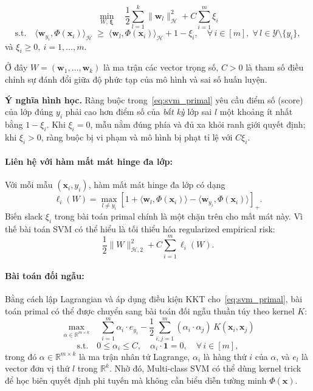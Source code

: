 \begin{equation}
    \min_{W,\,\bm{\xi}}\quad
    \frac{1}{2}\sum_{l=1}^{k}\|\bm{w}_l\|_{\mathcal{H}}^2 + C\sum_{i=1}^{m}\xi_i
    \label{eq:svm_primal}
\end{equation}
\[
    \text{s.t.}\quad
    \langle \bm{w}_{y_i},\Phi(\bm{x}_i)\rangle_{\mathcal{H}} \;\geq\;
    \langle \bm{w}_l,\Phi(\bm{x}_i)\rangle_{\mathcal{H}} + 1 - \xi_i,
    \quad \forall\, i\in[m],\; \forall\, l \in \mathcal{Y}\setminus\{y_i\},
\]
và $\xi_i\geq 0,\ i=1,\ldots,m$.

Ở đây $W = (\bm{w}_1,\ldots,\bm{w}_k)$ là ma trận các vector trọng số, $C > 0$ là tham số điều chỉnh sự đánh đổi giữa độ phức tạp của mô hình và sai số huấn luyện.

\textbf{Ý nghĩa hình học.} Ràng buộc trong~\eqref{eq:svm_primal} yêu cầu điểm số (score) của lớp đúng $y_i$ phải cao hơn điểm số của \emph{bất kỳ} lớp sai $l$ một khoảng ít nhất bằng $1 - \xi_i$. Khi $\xi_i = 0$, mẫu nằm đúng phía và đủ xa khỏi ranh giới quyết định; khi $\xi_i > 0$, ràng buộc bị vi phạm và mô hình bị phạt tỉ lệ với $C\xi_i$.

\paragraph{Liên hệ với hàm mất mát hinge đa lớp:}
Với mỗi mẫu $(\bm{x}_i,y_i)$, hàm mất mát hinge đa lớp có dạng
\[
  \ell_i(W)=\max_{l\neq y_i}\left[1+\bigl\langle \bm{w}_l,\Phi(\bm{x}_i)\bigr\rangle
  -\bigl\langle \bm{w}_{y_i},\Phi(\bm{x}_i)\bigr\rangle\right]_+.
\]
Biến slack $\xi_i$ trong bài toán primal chính là một chặn trên cho mất mát này. Vì thế bài toán SVM có thể hiểu là tối thiểu hóa regularized empirical risk:
\[
  \frac{1}{2}\|W\|_{\mathcal{H},2}^2+C\sum_{i=1}^{m}\ell_i(W).
\]

\paragraph{Bài toán đối ngẫu:}
Bằng cách lập Lagrangian và áp dụng điều kiện KKT cho~\eqref{eq:svm_primal}, bài toán primal có thể được chuyển sang bài toán đối ngẫu thuần túy theo kernel $K$:
\begin{equation}
    \max_{\alpha \in \mathbb{R}^{m\times k}}\quad
    \sum_{i=1}^{m} \alpha_i \cdot e_{y_i}
    - \frac{1}{2}\sum_{i,j=1}^{m}(\alpha_i\cdot\alpha_j)\,K(\bm{x}_i,\bm{x}_j)
    \label{eq:svm_dual}
\end{equation}
\[
    \text{s.t.}\quad 0 \leq \alpha_i \leq C,\quad \alpha_i\cdot\mathbf{1}=0,
    \quad \forall\,i\in[m],
\]
trong đó $\alpha\in\mathbb{R}^{m\times k}$ là ma trận nhân tử Lagrange, $\alpha_i$ là hàng thứ $i$ của $\alpha$, và $e_l$ là vector đơn vị thứ $l$ trong $\mathbb{R}^k$.
Nhờ đó, Multi-class SVM có thể dùng kernel trick để học biên quyết định phi tuyến mà không cần biểu diễn tường minh $\Phi(\bm{x})$.

